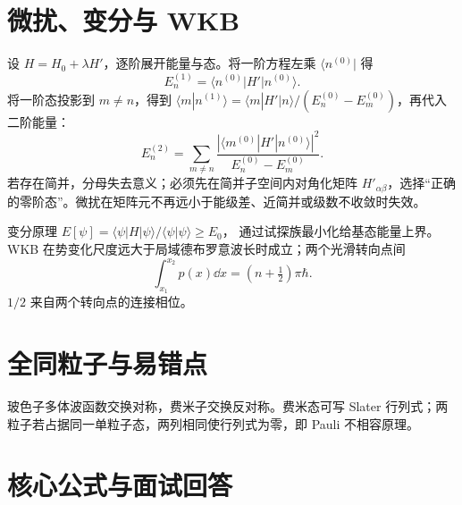 \section{微扰、变分与 WKB}
设 $H=H_0+\lambda H'$，逐阶展开能量与态。将一阶方程左乘
$\langle n^{(0)}|$ 得
\[
E_n^{(1)}=\langle n^{(0)}|H'|n^{(0)}\rangle.
\]
将一阶态投影到 $m\ne n$，得到
$\langle m|n^{(1)}\rangle=\langle m|H'|n\rangle/(E_n^{(0)}-E_m^{(0)})$，再代入二阶能量：
\[
\boxed{E_n^{(2)}=\sum_{m\ne n}
\frac{|\langle m^{(0)}|H'|n^{(0)}\rangle|^2}
{E_n^{(0)}-E_m^{(0)}}}.
\]
若存在简并，分母失去意义；必须先在简并子空间内对角化矩阵
$H'_{\alpha\beta}$，选择“正确的零阶态”。微扰在矩阵元不再远小于能级差、近简并或级数不收敛时失效。

变分原理
$E[\psi]=\langle\psi|H|\psi\rangle/\langle\psi|\psi\rangle\ge E_0$，
通过试探族最小化给基态能量上界。WKB 在势变化尺度远大于局域德布罗意波长时成立；两个光滑转向点间
\[
\boxed{\int_{x_1}^{x_2}p(x)\dd x=(n+\tfrac12)\pi\hbar}.
\]
$1/2$ 来自两个转向点的连接相位。

\section{全同粒子与易错点}
玻色子多体波函数交换对称，费米子交换反对称。费米态可写 Slater 行列式；两粒子若占据同一单粒子态，两列相同使行列式为零，即 Pauli 不相容原理。
\section{核心公式与面试回答}
